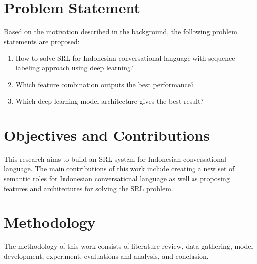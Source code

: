 \section{Problem Statement}
Based on the motivation described in the background, the following problem statements are proposed:
\begin{enumerate}
	\item How to solve SRL for Indonesian conversational language with sequence labeling approach using deep learning? 
	\item Which feature combination outputs the best performance?
	\item Which deep learning model architecture gives the best result?
\end{enumerate}

\section{Objectives and Contributions}
This research aims to build an SRL system for Indonesian conversational language. The main contributions of this work include creating a new set of semantic roles for Indonesian conversational language as well as proposing features and architectures for solving the SRL problem.

\section{Methodology}
The methodology of this work consists of literature review, data gathering, model development, experiment, evaluations and analysis, and conclusion.

